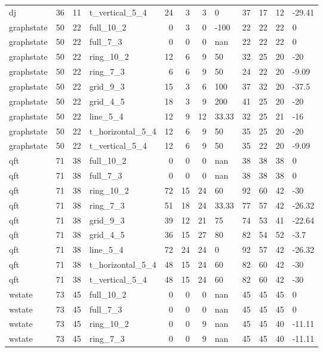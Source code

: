 \begin{longtable}{lrrlrrrlrrrl}
dj & 36 & 11 & t\_vertical\_5\_4 & 24 & 3 & 3 & 0 & 37 & 17 & 12 & -29.41 \\
graphstate & 50 & 22 & full\_10\_2 & 0 & 3 & 0 & -100 & 22 & 22 & 22 & 0 \\
graphstate & 50 & 22 & full\_7\_3 & 0 & 0 & 0 & nan & 22 & 22 & 22 & 0 \\
graphstate & 50 & 22 & ring\_10\_2 & 12 & 6 & 9 & 50 & 32 & 25 & 20 & -20 \\
graphstate & 50 & 22 & ring\_7\_3 & 6 & 6 & 9 & 50 & 24 & 22 & 20 & -9.09 \\
graphstate & 50 & 22 & grid\_9\_3 & 15 & 3 & 6 & 100 & 37 & 32 & 20 & -37.5 \\
graphstate & 50 & 22 & grid\_4\_5 & 18 & 3 & 9 & 200 & 41 & 25 & 20 & -20 \\
graphstate & 50 & 22 & line\_5\_4 & 12 & 9 & 12 & 33.33 & 32 & 25 & 21 & -16 \\
graphstate & 50 & 22 & t\_horizontal\_5\_4 & 12 & 6 & 9 & 50 & 35 & 25 & 20 & -20 \\
graphstate & 50 & 22 & t\_vertical\_5\_4 & 12 & 6 & 9 & 50 & 35 & 22 & 20 & -9.09 \\
qft & 71 & 38 & full\_10\_2 & 0 & 0 & 0 & nan & 38 & 38 & 38 & 0 \\
qft & 71 & 38 & full\_7\_3 & 0 & 0 & 0 & nan & 38 & 38 & 38 & 0 \\
qft & 71 & 38 & ring\_10\_2 & 72 & 15 & 24 & 60 & 92 & 60 & 42 & -30 \\
qft & 71 & 38 & ring\_7\_3 & 51 & 18 & 24 & 33.33 & 77 & 57 & 42 & -26.32 \\
qft & 71 & 38 & grid\_9\_3 & 39 & 12 & 21 & 75 & 74 & 53 & 41 & -22.64 \\
qft & 71 & 38 & grid\_4\_5 & 36 & 15 & 27 & 80 & 82 & 54 & 52 & -3.7 \\
qft & 71 & 38 & line\_5\_4 & 72 & 24 & 24 & 0 & 92 & 57 & 42 & -26.32 \\
qft & 71 & 38 & t\_horizontal\_5\_4 & 48 & 15 & 24 & 60 & 82 & 60 & 42 & -30 \\
qft & 71 & 38 & t\_vertical\_5\_4 & 48 & 15 & 24 & 60 & 82 & 60 & 42 & -30 \\
wstate & 73 & 45 & full\_10\_2 & 0 & 0 & 0 & nan & 45 & 45 & 45 & 0 \\
wstate & 73 & 45 & full\_7\_3 & 0 & 0 & 0 & nan & 45 & 45 & 45 & 0 \\
wstate & 73 & 45 & ring\_10\_2 & 0 & 0 & 9 & nan & 45 & 45 & 40 & -11.11 \\
wstate & 73 & 45 & ring\_7\_3 & 0 & 0 & 9 & nan & 45 & 45 & 40 & -11.11 \\

\end{longtable}
